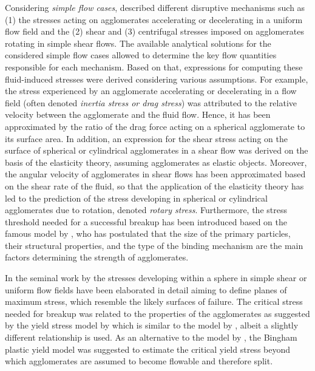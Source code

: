Considering \emph{simple flow cases},
\citet{rumpf1932desagglomeration} described different disruptive
mechanisms such as (1) the stresses acting on agglomerates
accelerating or decelerating in a uniform flow field and the (2) shear
and (3) centrifugal stresses imposed on agglomerates rotating in
simple shear flows. The available analytical solutions for the
considered simple flow cases allowed to determine the key flow
quantities responsible for each mechanism.  Based on that, expressions
for computing these fluid-induced stresses were derived considering
various assumptions.  For example, the stress experienced by an
agglomerate accelerating or decelerating in a flow field (often
denoted \emph{inertia stress or drag stress}) was attributed to the
relative velocity between the agglomerate and the fluid flow. Hence,
it has been approximated by the ratio of the drag force acting on a
spherical agglomerate to its surface area. In addition, an expression
for the shear stress acting on the surface of spherical or cylindrical
agglomerates in a shear flow was derived on the basis of the
elasticity theory, assuming agglomerates as elastic objects.
Moreover, the angular velocity of agglomerates in shear flows has been
approximated based on the shear rate of the fluid, so that the
application of the elasticity theory has led to the prediction of the
stress developing in spherical or cylindrical agglomerates due to
rotation, denoted \emph{rotary stress}. Furthermore, the stress
threshold needed for a successful breakup has been introduced based on
the famous model by \citet{rumpf1962}, who has postulated that the
size of the primary particles, their structural properties, and the
type of the binding mechanism are the main factors determining the
strength of agglomerates.

In the seminal work by \citet{tomi1978behaviour} the stresses
developing within a sphere in simple shear or uniform flow fields have
been elaborated in detail aiming to define planes of maximum stress,
which resemble the likely surfaces of failure. The critical stress
needed for breakup was related to the properties of the agglomerates
as suggested by the yield stress model by \citet{thomas1963transport}
which is similar to the model by \citet{rumpf1962}, albeit a slightly
different relationship is used. As an alternative to the model by
\citet{thomas1963transport}, the Bingham plastic yield model was
suggested to estimate the critical yield stress beyond which
agglomerates are assumed to become flowable and therefore
split. \newline


